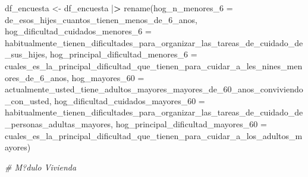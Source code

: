 \documentclass[
]{book}
\newenvironment{Shaded}{\begin{snugshade}}{\end{snugshade}}
\newcommand{\AttributeTok}[1]{\textcolor[rgb]{0.77,0.63,0.00}{#1}}
\newcommand{\CommentTok}[1]{\textcolor[rgb]{0.56,0.35,0.01}{\textit{#1}}}
\newcommand{\ErrorTok}[1]{\textcolor[rgb]{0.64,0.00,0.00}{\textbf{#1}}}
\newcommand{\FunctionTok}[1]{\textcolor[rgb]{0.00,0.00,0.00}{#1}}
\newcommand{\NormalTok}[1]{#1}
\newcommand{\OtherTok}[1]{\textcolor[rgb]{0.56,0.35,0.01}{#1}}
\newcommand{\SpecialCharTok}[1]{\textcolor[rgb]{0.00,0.00,0.00}{#1}}
\theoremstyle{definition}
\theoremstyle{definition}
\theoremstyle{definition}
\theoremstyle{definition}
\theoremstyle{remark}
\begin{document}
\begin{Shaded}
\begin{Highlighting}[]
\NormalTok{df\_encuesta }\OtherTok{\textless{}{-}}\NormalTok{ df\_encuesta }\SpecialCharTok{|}\ErrorTok{\textgreater{}}
\FunctionTok{rename}\NormalTok{(}\AttributeTok{hog\_n\_menores\_6 =}\NormalTok{ de\_esos\_hijes\_cuantos\_tienen\_menos\_de\_6\_anos,}
       \AttributeTok{hog\_dificultad\_cuidados\_menores\_6 =}\NormalTok{ habitualmente\_tienen\_dificultades\_para\_organizar\_las\_tareas\_de\_cuidado\_de\_sus\_hijes,}
       \AttributeTok{hog\_principal\_dificultad\_menores\_6 =}\NormalTok{ cuales\_es\_la\_principal\_dificultad\_que\_tienen\_para\_cuidar\_a\_les\_nines\_menores\_de\_6\_anos,}
       \AttributeTok{hog\_mayores\_60 =}\NormalTok{ actualmente\_usted\_tiene\_adultos\_mayores\_mayores\_de\_60\_anos\_conviviendo\_con\_usted,}
       \AttributeTok{hog\_dificultad\_cuidados\_mayores\_60 =}\NormalTok{ habitualmente\_tienen\_dificultades\_para\_organizar\_las\_tareas\_de\_cuidado\_de\_personas\_adultas\_mayores,}
       \AttributeTok{hog\_principal\_dificultad\_mayores\_60 =}\NormalTok{ cuales\_es\_la\_principal\_dificultad\_que\_tienen\_para\_cuidar\_a\_los\_adultos\_mayores)}

\CommentTok{\# M?dulo Vivienda}


\end{Highlighting}
\end{Shaded}
\end{document}

